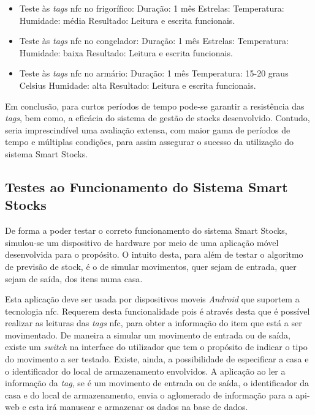 \begin{itemize}
    \item Teste às \textit{tags} \acrshort{nfc} no frigorífico: 
    Duração: 1 mês
    Estrelas:
    Temperatura:
    Humidade: média
    Resultado: Leitura e escrita funcionais.
    \item Teste às \textit{tags} \acrshort{nfc} no congelador:
    Duração: 1 mês
    Estrelas:
    Temperatura: 
    Humidade: baixa
    Resultado: Leitura e escrita funcionais.
    \item Teste às \textit{tags} \acrshort{nfc} no armário:
    Duração: 1 mês
    Temperatura: 15-20 graus Celsius
    Humidade: alta
    Resultado: Leitura e escrita funcionais.
\end{itemize}

Em conclusão, para curtos períodos de tempo pode-se garantir a resistência das \textit{tags}, bem como, a eficácia do sistema de gestão de stocks desenvolvido. Contudo, seria imprescindível uma avaliação extensa, com maior gama de períodos de tempo e múltiplas condições, para assim assegurar o sucesso da utilização do sistema Smart Stocks.

\subsection{Testes ao Funcionamento do Sistema Smart Stocks}

De forma a poder testar o correto funcionamento do sistema Smart Stocks, simulou-se um dispositivo de hardware por meio de uma aplicação móvel desenvolvida para o propósito. O intuito desta, para além de testar o algoritmo de previsão de stock, é o de simular movimentos, quer sejam de entrada, quer sejam de saída, dos itens numa casa.

Esta aplicação deve ser usada por dispositivos moveis \textit{Android} que suportem a tecnologia \acrshort{nfc}. Requerem desta funcionalidade pois é através desta que é possível realizar as leituras das \textit{tags} \acrshort{nfc}, para obter a informação do item que está a ser movimentado. De maneira a simular um movimento de entrada ou de saída, existe um \textit{switch} na interface do utilizador que tem o propósito de indicar o tipo do movimento a ser testado. Existe, ainda, a possibilidade de especificar a casa e o identificador do local de armazenamento envolvidos. A aplicação ao ler a informação da \textit{tag}, se é um movimento de entrada ou de saída, o identificador da casa e do local de armazenamento, envia o aglomerado de informação para a \gls{api-web} e esta irá manusear e armazenar os dados na base de dados.

